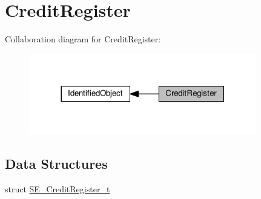 \hypertarget{group__CreditRegister}{}\section{Credit\+Register}
\label{group__CreditRegister}
Collaboration diagram for Credit\+Register\+:\nopagebreak
\begin{figure}[H]
\begin{center}
\leavevmode
\includegraphics[width=281pt]{group__CreditRegister}
\end{center}
\end{figure}
\subsection*{Data Structures}
\begin{DoxyCompactItemize}
\item 
struct \hyperlink{structSE__CreditRegister__t}{S\+E\+\_\+\+Credit\+Register\+\_\+t}
\end{DoxyCompactItemize}
